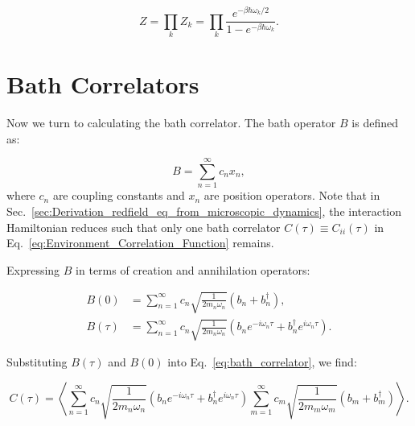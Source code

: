 \begin{equation} \label{eq:generalized_partition_function}
	Z = \prod_k Z_k = \prod_k \frac{e^{-\beta \hbar \omega_k / 2}}{1 - e^{-\beta \hbar \omega_k}}.
\end{equation}

\section{Bath Correlators}
\label{sec:bath_corr_trans_rates}

Now we turn to calculating the bath correlator.
The bath operator \( B \) is defined as:

\begin{equation} \label{eq:bath_operator}
	B = \sum_{n=1}^{\infty} c_n x_n,
\end{equation}
where \( c_n \) are coupling constants and \( x_n \) are position operators. Note that in Sec.~\ref{sec:Derivation_redfield_eq_from_microscopic_dynamics}, the interaction Hamiltonian reduces such that only one bath correlator \( C(\tau) \equiv C_{ii}(\tau) \) in Eq.~\eqref{eq:Environment_Correlation_Function} remains.

Expressing \( B \) in terms of creation and annihilation operators:

\begin{align}
	B(0)    & = \sum_{n=1}^{\infty} c_n \sqrt{\frac{1}{2 m_n \omega_n}} (b_n + b_n^\dagger), \label{eq:bath_operator_t0}                                                        \\
	B(\tau) & = \sum_{n=1}^{\infty} c_n \sqrt{\frac{1}{2 m_n \omega_n}} \left( b_n e^{-i \omega_n \tau} + b_n^\dagger e^{i \omega_n \tau} \right). \label{eq:bath_operator_tau}
\end{align}

Substituting \( B(\tau) \) and \( B(0) \) into Eq.~\eqref{eq:bath_correlator}, we find:

\begin{equation} \label{eq:correlator_substitution}
	C(\tau) = \left\langle \sum_{n=1}^{\infty} c_n \sqrt{\frac{1}{2 m_n \omega_n}} (b_n e^{-i \omega_n \tau} + b_n^\dagger e^{i \omega_n \tau}) \sum_{m=1}^{\infty} c_m \sqrt{\frac{1}{2 m_m \omega_m}} (b_m + b_m^\dagger) \right\rangle.
\end{equation}

